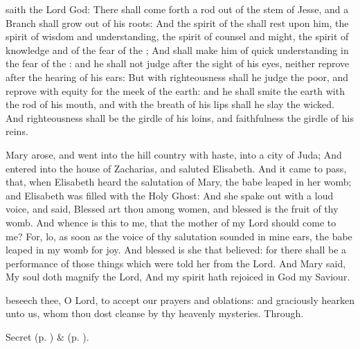  saith the Lord God: There shall come forth a rod out of the stem of Jesse, and a Branch shall grow out of his roots: And the spirit of the  shall rest upon him, the spirit of wisdom and understanding, the spirit of counsel and might, the spirit of knowledge and of the fear of the ; And shall make him of quick understanding in the fear of the : and he shall not judge after the sight of his eyes, neither reprove after the hearing of his ears: But with righteousness shall he judge the poor, and reprove with equity for the meek of the earth: and he shall smite the earth with the rod of his mouth, and with the breath of his lips shall he slay the wicked. And righteousness shall be the girdle of his loins, and faithfulness the girdle of his reins.


 Mary arose, and went into the hill country with haste, into a city of Juda; And entered into the house of Zacharias, and saluted Elisabeth. And it came to pass, that, when Elisabeth heard the salutation of Mary, the babe leaped in her womb; and Elisabeth was filled with the Holy Ghost: And she spake out with a loud voice, and said, Blessed art thou among women, and blessed is the fruit of thy womb. And whence is this to me, that the mother of my Lord should come to me? For, lo, as soon as the voice of thy salutation sounded in mine ears, the babe leaped in my womb for joy. And blessed is she that believed: for there shall be a performance of those things which were told her from the Lord. And Mary said, My soul doth magnify the Lord, And my spirit hath rejoiced in God my Saviour.


\secret
{} beseech thee, O Lord, to accept our prayers and oblations: and graciously hearken unto us, whom thou dost cleanse by thy heavenly mysteries. Through.

\begin{rubric}
     Secret  (p. \pageref{AdventISecret}) \&   (p. \pageref{SPMaryInAdvent}).
\end{rubric}

